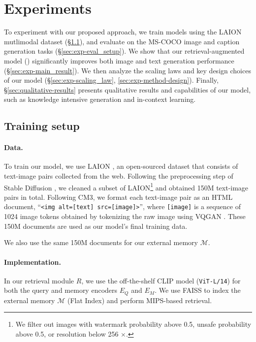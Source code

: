 \section{Experiments}
\label{sec:experiments}
To experiment with our proposed approach, we train models using the LAION mutlimodal dataset (\S \ref{sec:exp-train_setup}), and evaluate on the MS-COCO image and caption generation tasks (\S \ref{sec:exp-eval_setup}).
We show that our retrieval-augmented model (\methodname) significantly improves both image and text  generation performance (\S \ref{sec:exp-main_result}). 
We then analyze the scaling laws and key design choices of our model (\S \ref{sec:exp-scaling_law}, \ref{sec:exp-method-design}).
Finally, \S \ref{sec:qualitative-results} presents qualitative results and capabilities of our model, such as knowledge intensive generation and in-context learning.



\subsection{Training setup} 
\label{sec:exp-train_setup}
\paragraph{Data.}
To train our model, we use LAION \cite{schuhmann2021laion}, an open-sourced dataset that consists of text-image pairs collected from the web.
Following the preprocessing step of Stable Diffusion \cite{rombach2022high}, we cleaned a subset of LAION\footnote{We filter out images with watermark probability above 0.5, unsafe probability above 0.5, or resolution below 256 \!$\times$.} and obtained 150M text-image pairs in total. Following CM3, we format each text-image pair as an HTML document, ``\texttt{<img alt=[text] src=[image]>}'', where \texttt{[image]} is a sequence of 1024 image tokens obtained by tokenizing the raw image using VQGAN \cite{esser2021taming, gafni2022make}.
These 150M documents are used as our model's final training data. 

We also use the same 150M documents for our external memory $\mathcal{M}$.


\paragraph{Implementation.}
In our retrieval module $R$, we use the off-the-shelf CLIP model (\texttt{ViT-L/14}) \cite{radford2021learning} for both the query and memory encoders $E_Q$ and $E_M$.
We use FAISS \cite{johnson2019billion} to index the external memory $\mathcal{M}$ (Flat Index) and perform MIPS-based retrieval.

